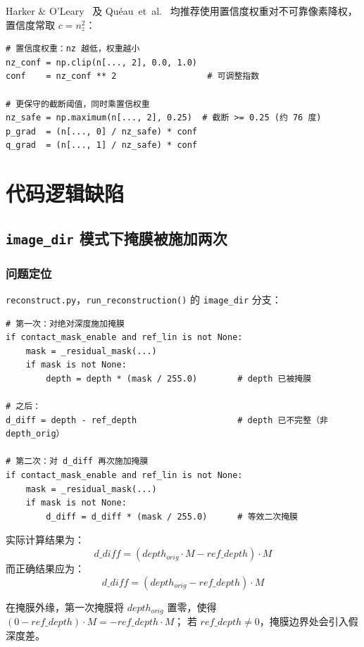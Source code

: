 \documentclass[12pt, a4paper]{ctexart}
\begin{document}
Harker \& O'Leary~\cite{harker2008least} 及 Qu\'eau~et~al.~\cite{queeau2018normal}
均推荐使用置信度权重对不可靠像素降权，置信度常取 $c = n_z^2$：

\begin{fixbox}
\begin{lstlisting}
# 置信度权重：nz 越低，权重越小
nz_conf = np.clip(n[..., 2], 0.0, 1.0)
conf    = nz_conf ** 2                  # 可调整指数

# 更保守的截断阈值，同时乘置信权重
nz_safe = np.maximum(n[..., 2], 0.25)  # 截断 >= 0.25 (约 76 度)
p_grad  = (n[..., 0] / nz_safe) * conf
q_grad  = (n[..., 1] / nz_safe) * conf
\end{lstlisting}
\end{fixbox}

\section{代码逻辑缺陷}
\label{sec:bugs}

\subsection{\texttt{image\_dir} 模式下掩膜被施加两次}
\label{subsec:double_mask}

\subsubsection*{问题定位}

\texttt{reconstruct.py}，\texttt{run\_reconstruction()} 的 \texttt{image\_dir} 分支：

\begin{lstlisting}[caption={接触掩膜被连续施加两次，导致 d\_diff 计算错误}]
# 第一次：对绝对深度施加掩膜
if contact_mask_enable and ref_lin is not None:
    mask = _residual_mask(...)
    if mask is not None:
        depth = depth * (mask / 255.0)        # depth 已被掩膜

# 之后：
d_diff = depth - ref_depth                    # depth 已不完整（非 depth_orig）

# 第二次：对 d_diff 再次施加掩膜
if contact_mask_enable and ref_lin is not None:
    mask = _residual_mask(...)
    if mask is not None:
        d_diff = d_diff * (mask / 255.0)      # 等效二次掩膜
\end{lstlisting}

\begin{bugbox}
实际计算结果为：
\[
  d\_diff = (depth_{orig} \cdot M - ref\_depth) \cdot M
\]
而正确结果应为：
\[
  d\_diff = (depth_{orig} - ref\_depth) \cdot M
\]

在掩膜外缘，第一次掩膜将 $depth_{orig}$ 置零，使得
$(0 - ref\_depth) \cdot M = -ref\_depth \cdot M$；
若 $ref\_depth \neq 0$，掩膜边界处会引入假深度差。
\end{bugbox}
\end{document}
